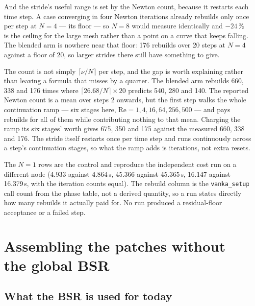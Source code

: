 \documentclass[11pt,a4paper]{article}
\newcommand{\code}[1]{\texttt{\small #1}}
\newcommand{\Rey}{\mathrm{Re}}
\begin{document}
And the stride's useful range is set by the Newton count, because it restarts each time step. A
case converging in four Newton iterations already rebuilds only once per step at $N=4$ --- its
floor --- so $N=8$ would measure identically and $-24\,\%$ is the ceiling for the large mesh
rather than a point on a curve that keeps falling. The blended arm is nowhere near that floor:
176 rebuilds over 20 steps at $N=4$ against a floor of 20, so larger strides there still have
something to give.

The count is not simply $\lceil \nu/N \rceil$ per step, and the gap is worth explaining rather than
leaving a formula that misses by a quarter. The blended arm rebuilds 660, 338 and 176 times where
$\lceil 26.68/N \rceil \times 20$ predicts 540, 280 and 140. The reported Newton count is a mean
over steps 2 onwards, but the first step walks the whole continuation ramp --- six stages here,
$\Rey = 1, 4, 16, 64, 256, 500$ --- and pays rebuilds for all of them while contributing nothing
to that mean. Charging the ramp its six stages' worth gives 675, 350 and 175 against the measured
660, 338 and 176. The stride itself restarts once per time step and runs continuously across a
step's continuation stages, so what the ramp adds is iterations, not extra resets.

\begin{tcolorbox}[colback=blue!4,colframe=blue!50!black,title={\bfseries How this was checked}]
The $N=1$ rows are the control and reproduce the independent cost run on a different node
(4.933 against 4.864\,s, 45.366 against 45.365\,s, 16.147 against 16.379\,s, with the iteration
counts equal). The rebuild column is the \code{vanka\_setup} call count from the phase table, not
a derived quantity, so a run states directly how many rebuilds it actually paid for. No run
produced a residual-floor acceptance or a failed step.
\end{tcolorbox}

\section{Assembling the patches without the global BSR}
\label{sec:nobsr}

\subsection{What the BSR is used for today}
\end{document}

